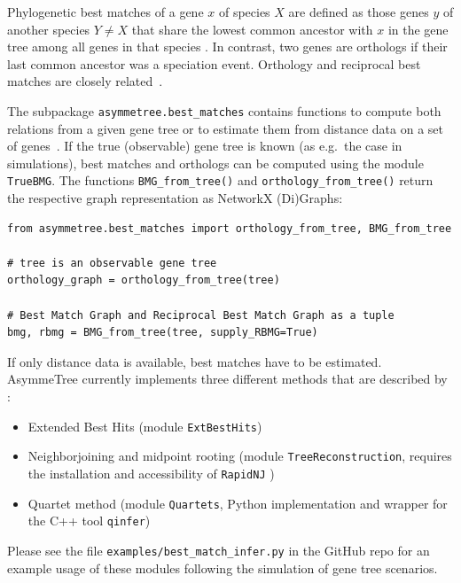 \documentclass[hidelinks,11pt]{article}
\begin{document}
Phylogenetic best matches of a gene $x$ of species $X$ are defined as those genes $y$ of another species $Y\ne X$ that share the lowest common ancestor with $x$ in the gene tree among all genes in that species \citep{geiss2019a,geiss2020b,geiss2020c}.
In contrast, two genes are orthologs if their last common ancestor was a speciation event.
Orthology and reciprocal best matches are closely related~\citep{geiss2020c}.

The subpackage \texttt{asymmetree.best\_matches} contains functions to compute both relations from a given gene tree or to estimate them from distance data on a set of genes~\citep{stadler2020}.
If the true (observable) gene tree is known (as e.g.\ the case in simulations), best matches and orthologs can be computed using the module \texttt{TrueBMG}.
The functions \texttt{BMG\_from\_tree()} and \texttt{orthology\_from\_tree()} return the respective graph representation as NetworkX (Di)Graphs:

\begin{adjustwidth}{1cm}{1cm}\vspace{2mm}
\begin{verbatim}
from asymmetree.best_matches import orthology_from_tree, BMG_from_tree

# tree is an observable gene tree
orthology_graph = orthology_from_tree(tree)

# Best Match Graph and Reciprocal Best Match Graph as a tuple
bmg, rbmg = BMG_from_tree(tree, supply_RBMG=True)
\end{verbatim}
\end{adjustwidth}

\noindent
If only distance data is available, best matches have to be estimated.
AsymmeTree currently implements three different methods that are described by \citet{stadler2020}:
\begin{itemize}
	\item Extended Best Hits (module \texttt{ExtBestHits})
	\item Neighborjoining \cite{saitou1987} and midpoint rooting (module \texttt{TreeReconstruction}, requires the installation and accessibility of \texttt{RapidNJ} \citep{simonsen2008})
	\item Quartet method (module \texttt{Quartets}, Python implementation and wrapper for the C++ tool \texttt{qinfer})
\end{itemize}

Please see the file \texttt{examples/best\_match\_infer.py} in the GitHub repo for an example usage of these modules following the simulation of gene tree scenarios.
\end{document}
